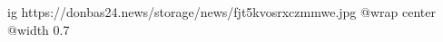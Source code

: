  
 
 
 
 

\ifcmt
  ig https://donbas24.news/storage/news/fjt5kvosrxczmmwe.jpg
  @wrap center
  @width 0.7
\fi
